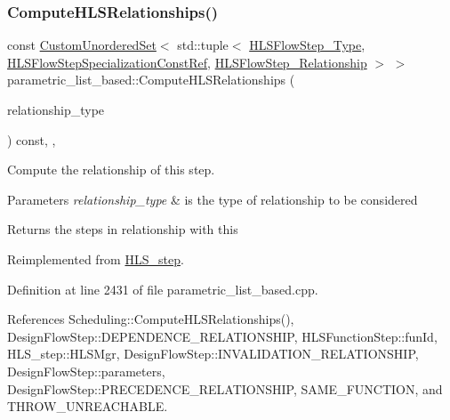 \subsubsection{\texorpdfstring{Compute\+H\+L\+S\+Relationships()}{ComputeHLSRelationships()}}
{\footnotesize\ttfamily const \hyperlink{classCustomUnorderedSet}{Custom\+Unordered\+Set}$<$ std\+::tuple$<$ \hyperlink{hls__step_8hpp_ada16bc22905016180e26fc7e39537f8d}{H\+L\+S\+Flow\+Step\+\_\+\+Type}, \hyperlink{hls__step_8hpp_a5fdd2edf290c196531d21d68e13f0e74}{H\+L\+S\+Flow\+Step\+Specialization\+Const\+Ref}, \hyperlink{hls__step_8hpp_a3ad360b9b11e6bf0683d5562a0ceb169}{H\+L\+S\+Flow\+Step\+\_\+\+Relationship} $>$ $>$ parametric\+\_\+list\+\_\+based\+::\+Compute\+H\+L\+S\+Relationships (\begin{DoxyParamCaption}\item[{const \hyperlink{classDesignFlowStep_a723a3baf19ff2ceb77bc13e099d0b1b7}{Design\+Flow\+Step\+::\+Relationship\+Type}}]{relationship\+\_\+type }\end{DoxyParamCaption}) const\hspace{0.3cm}{\ttfamily [override]}, {\ttfamily [private]}, {\ttfamily [virtual]}}



Compute the relationship of this step. 


\begin{DoxyParams}{Parameters}
{\em relationship\+\_\+type} & is the type of relationship to be considered \\
\hline
\end{DoxyParams}
\begin{DoxyReturn}{Returns}
the steps in relationship with this 
\end{DoxyReturn}


Reimplemented from \hyperlink{classHLS__step_aed0ce8cca9a1ef18e705fc1032ad4de5}{H\+L\+S\+\_\+step}.



Definition at line 2431 of file parametric\+\_\+list\+\_\+based.\+cpp.



References Scheduling\+::\+Compute\+H\+L\+S\+Relationships(), Design\+Flow\+Step\+::\+D\+E\+P\+E\+N\+D\+E\+N\+C\+E\+\_\+\+R\+E\+L\+A\+T\+I\+O\+N\+S\+H\+IP, H\+L\+S\+Function\+Step\+::fun\+Id, H\+L\+S\+\_\+step\+::\+H\+L\+S\+Mgr, Design\+Flow\+Step\+::\+I\+N\+V\+A\+L\+I\+D\+A\+T\+I\+O\+N\+\_\+\+R\+E\+L\+A\+T\+I\+O\+N\+S\+H\+IP, Design\+Flow\+Step\+::parameters, Design\+Flow\+Step\+::\+P\+R\+E\+C\+E\+D\+E\+N\+C\+E\+\_\+\+R\+E\+L\+A\+T\+I\+O\+N\+S\+H\+IP, S\+A\+M\+E\+\_\+\+F\+U\+N\+C\+T\+I\+ON, and T\+H\+R\+O\+W\+\_\+\+U\+N\+R\+E\+A\+C\+H\+A\+B\+LE.

